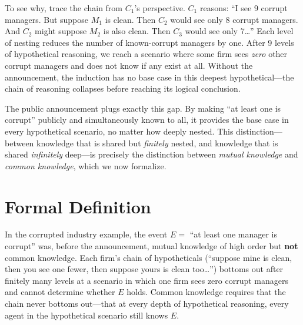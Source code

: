 To see why, trace the chain from $C_1$'s perspective. $C_1$ reasons: ``I see 9 corrupt managers. But suppose $M_1$ is clean. Then $C_2$ would see only 8 corrupt managers. And $C_2$ might suppose $M_2$ is also clean. Then $C_3$ would see only 7\ldots'' Each level of nesting reduces the number of known-corrupt managers by one. After 9 levels of hypothetical reasoning, we reach a scenario where some firm sees \textit{zero} other corrupt managers and does not know if any exist at all. Without the announcement, the induction has no base case in this deepest hypothetical---the chain of reasoning collapses before reaching its logical conclusion.

The public announcement plugs exactly this gap. By making ``at least one is corrupt'' publicly and simultaneously known to all, it provides the base case in every hypothetical scenario, no matter how deeply nested. This distinction---between knowledge that is shared but \textit{finitely} nested, and knowledge that is shared \textit{infinitely} deep---is precisely the distinction between \textit{mutual knowledge} and \textit{common knowledge}, which we now formalize.

\section{Formal Definition}


In the corrupted industry example, the event $E = $ ``at least one manager is corrupt'' was, before the announcement, mutual knowledge of high order but \textbf{not} common knowledge. Each firm's chain of hypotheticals (``suppose mine is clean, then you see one fewer, then suppose yours is clean too\ldots'') bottoms out after finitely many levels at a scenario in which one firm sees zero corrupt managers and cannot determine whether $E$ holds. Common knowledge requires that the chain never bottoms out---that at every depth of hypothetical reasoning, every agent in the hypothetical scenario still knows $E$.

